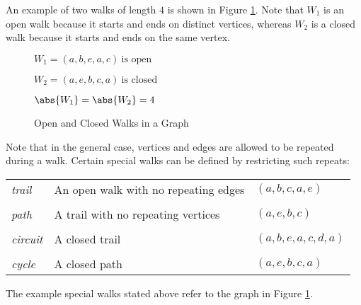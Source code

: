 An example of two walks of length \(4\) is shown in Figure \ref{fig:walks}.  Note that \(W_1\) is an open walk
because it starts and ends on distinct vertices, whereas \(W_2\) is a closed walk because it starts and ends on the
same vertex.

\begin{figure}[h]
  \label{fig:walks}
  \begin{minipage}{3in}
    \begin{center}
    \end{center}
  \end{minipage}
  \begin{minipage}{3in}
    \(W_1=(a,b,e,a,c)\ \text{is open}\)

    \(W_2=(a,e,b,c,a)\ \text{is closed}\)

    \bigskip

    \(\abs{W_1}=\abs{W_2}=4\)
  \end{minipage}
  \caption{Open and Closed Walks in a Graph}
\end{figure}

Note that in the general case, vertices and edges are allowed to be repeated during a walk.  Certain special walks
can be defined by restricting such repeats:

\begin{definition}
  \begin{tabular}{lll}
    \emph{trail} & An open walk with no repeating edges & \((a,b,c,a,e)\) \\
    \\
    \emph{path} & A trail with no repeating vertices & \((a,e,b,c)\) \\
    \\
    \emph{circuit} & A closed trail & \((a,b,e,a,c,d,a)\) \\
    \\
    \emph{cycle} & A closed path & \((a,e,b,c,a)\)
  \end{tabular}
\end{definition}

The example special walks stated above refer to the graph in Figure \ref{fig:walks}.

